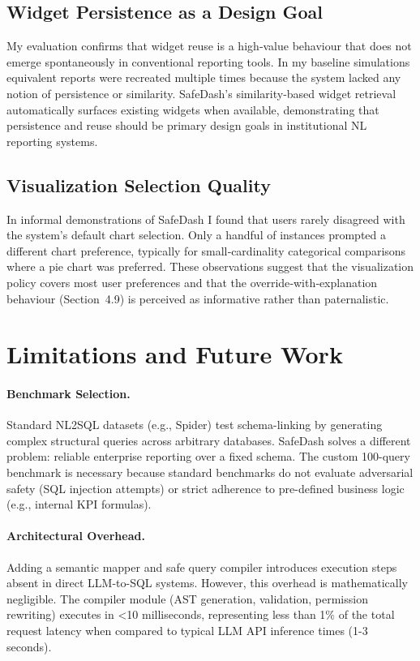\documentclass[11pt]{article}
\begin{document}
\subsection{Widget Persistence as a Design Goal}
My evaluation confirms that widget reuse is a high‑value behaviour that does not emerge spontaneously in conventional reporting tools. In my baseline simulations equivalent reports were recreated multiple times because the system lacked any notion of persistence or similarity. SafeDash’s similarity‑based widget retrieval automatically surfaces existing widgets when available, demonstrating that persistence and reuse should be primary design goals in institutional NL reporting systems.

\subsection{Visualization Selection Quality}
In informal demonstrations of SafeDash I found that users rarely disagreed with the system’s default chart selection. Only a handful of instances prompted a different chart preference, typically for small‑cardinality categorical comparisons where a pie chart was preferred. These observations suggest that the visualization policy covers most user preferences and that the override‑with‑explanation behaviour (Section 4.9) is perceived as informative rather than paternalistic.

\section{Limitations and Future Work\label{sec:limitations}}
\paragraph{Benchmark Selection.} Standard NL2SQL datasets (e.g., Spider) test schema-linking by generating complex structural queries across arbitrary databases. SafeDash solves a different problem: reliable enterprise reporting over a fixed schema. The custom 100-query benchmark is necessary because standard benchmarks do not evaluate adversarial safety (SQL injection attempts) or strict adherence to pre-defined business logic (e.g., internal KPI formulas).

\paragraph{Architectural Overhead.} Adding a semantic mapper and safe query compiler introduces execution steps absent in direct LLM-to-SQL systems. However, this overhead is mathematically negligible. The compiler module (AST generation, validation, permission rewriting) executes in <10 milliseconds, representing less than 1\% of the total request latency when compared to typical LLM API inference times (1-3 seconds).
\end{document}
